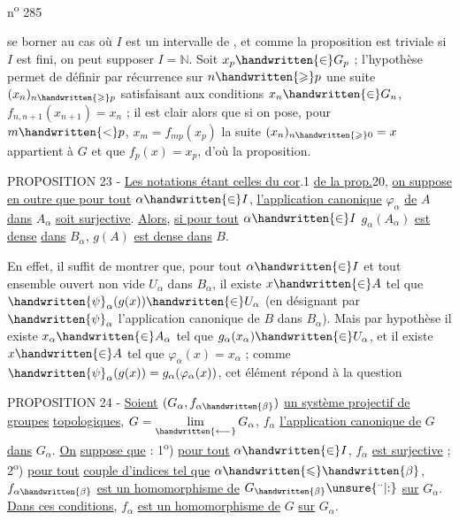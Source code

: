 \hfill n\textsuperscript{o} 285

se borner au cas où $I$ est un intervalle de \hspace{1.2em}, et comme la proposition
est triviale si $I$ est fini, on peut supposer $I=\mathbb{N}$. Soit $x_p\handwritten{\in}G_p$ ;
l'hypothèse permet de définir par récurrence sur $n\handwritten{\geqslant}p$ une suite $(x_n)_{n\handwritten{\geqslant}p}$
satisfaisant aux conditions $x_n\handwritten{\in}G_n$, $f_{n,n+1}(x_{n+1})=x_n$ ; il est clair
alors que si on pose, pour $m\handwritten{<}p$, $x_m=f_{mp}(x_p)$ la suite $(x_n)_{n\handwritten{\geqslant}0}=x$
appartient à $G$ et que $f_p(x)=x_p$, d'où la proposition.

PROPOSITION 23 - \uline{Les notations étant celles du cor}.1 \uline{de la prop.}20,
\uline{on suppose en outre que pour tout} $\alpha\handwritten{\in}I$, \uline{l'application canonique} $\varphi_\alpha$ \uline{de} $A$
\uline{dans} $A_\alpha$ \uline{soit surjective}. \uline{Alors}, \uline{si pour tout} $\alpha\handwritten{\in}I$ $g_\alpha(A_\alpha)$ \uline{est dense}
\uline{dans} $B_\alpha$, $g(A)$ \uline{est dense dans} $B$.

En effet, il suffit de montrer que, pour tout $\alpha\handwritten{\in}I$ et tout ensemble
ouvert non vide $U_\alpha$ dans $B_\alpha$, il existe $x\handwritten{\in}A$ tel que $\handwritten{\psi}_\alpha(g(x))\handwritten{\in}U_\alpha$ (en
désignant par $\handwritten{\psi}_\alpha$ l'application canonique de $B$ dans $B_\alpha$). Mais par hypothèse
il existe $x_\alpha\handwritten{\in}A_\alpha$ tel que $g_\alpha(x_\alpha)\handwritten{\in}U_\alpha$, et il existe $x\handwritten{\in}A$ tel que
$\varphi_\alpha(x)=x_\alpha$ ; comme $\handwritten{\psi}_\alpha(g(x))=g_\alpha(\varphi_\alpha(x))$, cet élément répond à la question

PROPOSITION 24 - \uline{Soient} $(G_\alpha,f_{\alpha\handwritten{\beta}})$ \uline{un système projectif de groupes}
\uline{topologiques}, $G=\underset{\handwritten{\longleftarrow}}{\lim}\,G_\alpha$, $f_\alpha$ \uline{l'application canonique de} $G$ \uline{dans} $G_\alpha$. \uline{On}
\uline{suppose que} : 1\textsuperscript{o}) \uline{pour tout} $\alpha\handwritten{\in}I$, $f_\alpha$ \uline{est surjective} ; 2\textsuperscript{o}) \uline{pour tout}
\uline{couple d'indices tel que} $\alpha\handwritten{\leqslant}\handwritten{\beta}$, $f_{\alpha\handwritten{\beta}}$ \uline{est un homomorphisme de} $G_{\handwritten{\beta}}\unsure{{}^{\cdot\cdot}|{:}}$ \uline{sur}
$G_\alpha$. \uline{Dans ces conditions}, $f_\alpha$ \uline{est un homomorphisme de} $G$ \uline{sur} $G_\alpha$.

